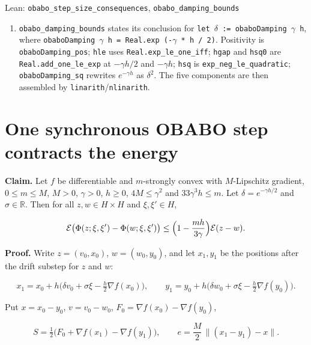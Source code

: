 \documentclass[11pt,a4paper]{article}
\begin{document}
\begin{leanbox}{Lean: \texttt{obabo\_\allowbreak{}step\_\allowbreak{}size\_\allowbreak{}consequences}, \texttt{obabo\_\allowbreak{}damping\_\allowbreak{}bounds}}
\begin{enumerate}
\item \texttt{obabo\_\allowbreak{}damping\_\allowbreak{}bounds} states its conclusion for \texttt{let \ensuremath{\delta} := obabo\allowbreak{}Damping \ensuremath{\gamma} h}, where \texttt{obabo\allowbreak{}Damping \ensuremath{\gamma} h = Real.\allowbreak{}exp (-\allowbreak{}\ensuremath{\gamma} * h /\allowbreak{} 2)}. Positivity is \texttt{obabo\allowbreak{}Damping\_\allowbreak{}pos}; \texttt{hle} uses \texttt{Real.\allowbreak{}exp\_\allowbreak{}le\_\allowbreak{}one\_\allowbreak{}iff}; \texttt{hgap} and \texttt{hsq0} are \texttt{Real.\allowbreak{}add\_\allowbreak{}one\_\allowbreak{}le\_\allowbreak{}exp} at \(-\gamma h/2\) and \(-\gamma h\); \texttt{hsq} is \texttt{exp\_\allowbreak{}neg\_\allowbreak{}le\_\allowbreak{}quadratic}; \texttt{obabo\allowbreak{}Damping\_\allowbreak{}sq} rewrites \(e^{-\gamma h}\) as \(\delta^2\). The five components are then assembled by \texttt{linarith}/\allowbreak{}\texttt{nlinarith}.

\end{enumerate}
\end{leanbox}

\section{\texorpdfstring{One synchronous OBABO step contracts the energy}{One synchronous OBABO step contracts the energy}}


\textbf{Claim.} Let \(f\) be differentiable and \(m\)-strongly convex with \(M\)-Lipschitz gradient, \(0\le m\le M\), \(M>0\), \(\gamma>0\), \(h\ge0\), \(4M\le\gamma^2\) and \(33\gamma^3h\le m\). Let \(\delta=e^{-\gamma h/2}\) and \(\sigma\in\mathbb R\). Then for all \(z,w\in H\times H\) and \(\xi,\xi'\in H\),


\[\mathcal E\bigl(\Phi(z;\xi,\xi')-\Phi(w;\xi,\xi')\bigr)\le\Bigl(1-\frac{mh}{3\gamma}\Bigr)\mathcal E(z-w).\]


\textbf{Proof.} Write \(z=(v_0,x_0)\), \(w=(w_0,y_0)\), and let \(x_1,y_1\) be the positions after the drift substep for \(z\) and \(w\):


\[x_1=x_0+h\bigl(\delta v_0+\sigma\xi-\tfrac h2\nabla f(x_0)\bigr),\qquad y_1=y_0+h\bigl(\delta w_0+\sigma\xi-\tfrac h2\nabla f(y_0)\bigr).\]


Put \(x=x_0-y_0\), \(v=v_0-w_0\), \(F_0=\nabla f(x_0)-\nabla f(y_0)\),


\[S=\tfrac12\bigl(F_0+\nabla f(x_1)-\nabla f(y_1)\bigr),\qquad e=\frac M2\,\|(x_1-y_1)-x\| .\]
\end{document}
